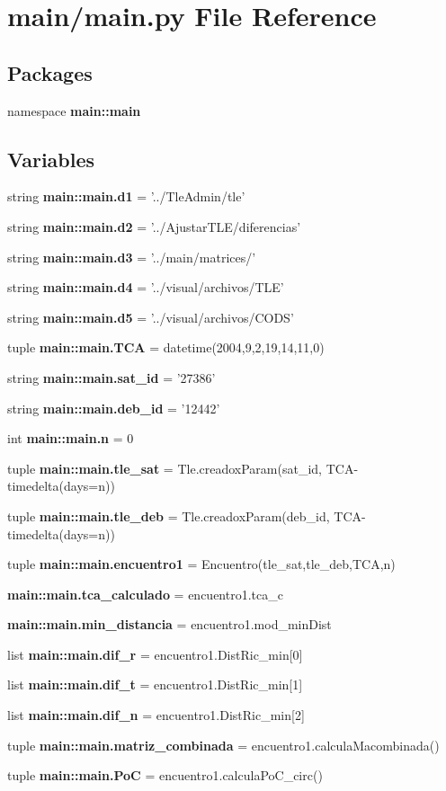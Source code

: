 \section{main/main.py \-File \-Reference}
\label{main_8py}
\subsection*{\-Packages}
\begin{DoxyCompactItemize}
\item 
namespace {\bf main\-::main}
\end{DoxyCompactItemize}
\subsection*{\-Variables}
\begin{DoxyCompactItemize}
\item 
string {\bf main\-::main.\-d1} = '../\-Tle\-Admin/tle'
\item 
string {\bf main\-::main.\-d2} = '../\-Ajustar\-T\-L\-E/diferencias'
\item 
string {\bf main\-::main.\-d3} = '../main/matrices/'
\item 
string {\bf main\-::main.\-d4} = '../visual/archivos/\-T\-L\-E'
\item 
string {\bf main\-::main.\-d5} = '../visual/archivos/\-C\-O\-D\-S'
\item 
tuple {\bf main\-::main.\-T\-C\-A} = datetime(2004,9,2,19,14,11,0)
\item 
string {\bf main\-::main.\-sat\-\_\-id} = '27386'
\item 
string {\bf main\-::main.\-deb\-\_\-id} = '12442'
\item 
int {\bf main\-::main.\-n} = 0
\item 
tuple {\bf main\-::main.\-tle\-\_\-sat} = \-Tle.\-creadox\-Param(sat\-\_\-id, \-T\-C\-A-\/timedelta(days=n))
\item 
tuple {\bf main\-::main.\-tle\-\_\-deb} = \-Tle.\-creadox\-Param(deb\-\_\-id, \-T\-C\-A-\/timedelta(days=n))
\item 
tuple {\bf main\-::main.\-encuentro1} = \-Encuentro(tle\-\_\-sat,tle\-\_\-deb,\-T\-C\-A,n)
\item 
{\bf main\-::main.\-tca\-\_\-calculado} = encuentro1.\-tca\-\_\-c
\item 
{\bf main\-::main.\-min\-\_\-distancia} = encuentro1.\-mod\-\_\-min\-Dist
\item 
list {\bf main\-::main.\-dif\-\_\-r} = encuentro1.\-Dist\-Ric\-\_\-min[0]
\item 
list {\bf main\-::main.\-dif\-\_\-t} = encuentro1.\-Dist\-Ric\-\_\-min[1]
\item 
list {\bf main\-::main.\-dif\-\_\-n} = encuentro1.\-Dist\-Ric\-\_\-min[2]
\item 
tuple {\bf main\-::main.\-matriz\-\_\-combinada} = encuentro1.\-calcula\-Macombinada()
\item 
tuple {\bf main\-::main.\-Po\-C} = encuentro1.\-calcula\-Po\-C\-\_\-circ()
\end{DoxyCompactItemize}
